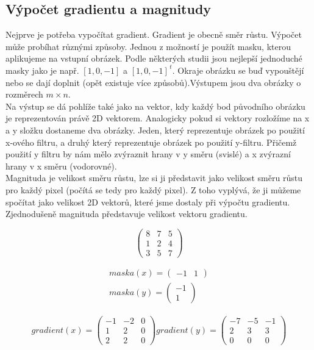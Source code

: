 \documentclass{report}
\begin{document}
\subsection{Výpočet gradientu a magnitudy}
Nejprve je potřeba vypočítat gradient. Gradient je obecně směr růstu. Výpočet může probíhat různými způsoby. Jednou z možností je použít masku, kterou aplikujeme na vstupní obrázek. Podle některých studii jsou nejlepší jednoduché masky jako je např. $[1, 0, -1]$ a $[1, 0, -1]^{\,t}$. Okraje obrázku se buď vypouštějí nebo se dají doplnit (opět existuje více způsobů).Výstupem jsou dva obrázky o rozměrech $m \times n$. \\
Na výstup se dá pohlíže také jako na vektor, kdy každý bod původního obrázku je reprezentován právě 2D vektorem. Analogicky pokud si vektory rozložíme na x a y složku dostaneme dva obrázky. Jeden, který reprezentuje obrázek po použití x-ového filtru, a druhý který reprezentuje obrázek po použití y-filtru. Přičemž použití y filtru by nám mělo zvýraznit hrany v y směru (svislé) a x zvýrazní hrany v x směru (vodorovné). \\
Magnituda je velikost směru růstu, lze si ji představit jako velikost směru růstu pro každý pixel (počítá se tedy pro každý pixel).  Z toho vyplývá, že ji můžeme spočítat jako velikost 2D vektorů, které jsme dostaly při výpočtu gradientu. Zjednodušeně magnituda představuje velikost vektoru gradientu.

\begin{displaymath} 
	\label{vstupni_matice} \begin{pmatrix}8 & 7 & 5 \\1 & 2 & 4 \\3 & 5 & 7 \end{pmatrix}
	\tag{Vstupni obrazek}
\end{displaymath}

\begin{align}
	\label{masky}
		maska(x) = \begin{pmatrix}-1 & 1 \end{pmatrix} \\
		maska(y) = \begin{pmatrix}-1 \\ 1 \end{pmatrix}
		\tag{Masky}
\end{align}

\begin{align}
	\label{vystupni_gradienty}
		gradient(x) = \begin{pmatrix}-1 & -2 & 0\\1 & 2 & 0 \\2 & 2 & 0 \end{pmatrix}
		gradient(y) = \begin{pmatrix}-7 & -5 & -1 \\2 & 3 & 3 \\0 & 0 & 0 \end{pmatrix}
		\tag{Gradienty}
\end{align}
\end{document}
